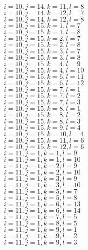 \documentclass[14pt]{article}
\begin{document}
    $i=10,j=14,k=11,l=8 $ \\ 
    $i=10,j=14,k=12,l=7 $ \\ 
    $i=10,j=14,k=12,l=8 $ \\ 
    $i=10,j=15,k=1,l=7 $ \\ 
    $i=10,j=15,k=1,l=8 $ \\ 
    $i=10,j=15,k=2,l=7 $ \\ 
    $i=10,j=15,k=2,l=8 $ \\ 
    $i=10,j=15,k=3,l=7 $ \\ 
    $i=10,j=15,k=3,l=8 $ \\ 
    $i=10,j=15,k=4,l=9 $ \\ 
    $i=10,j=15,k=4,l=10 $ \\ 
    $i=10,j=15,k=6,l=11 $ \\ 
    $i=10,j=15,k=6,l=12 $ \\ 
    $i=10,j=15,k=7,l=1 $ \\ 
    $i=10,j=15,k=7,l=2 $ \\ 
    $i=10,j=15,k=7,l=3 $ \\ 
    $i=10,j=15,k=8,l=1 $ \\ 
    $i=10,j=15,k=8,l=2 $ \\ 
    $i=10,j=15,k=8,l=3 $ \\ 
    $i=10,j=15,k=9,l=4 $ \\ 
    $i=10,j=15,k=10,l=4 $ \\ 
    $i=10,j=15,k=11,l=6 $ \\ 
    $i=10,j=15,k=12,l=6 $ \\ 
    $i=11,j=1,k=1,l=9 $ \\ 
    $i=11,j=1,k=1,l=10 $ \\ 
    $i=11,j=1,k=2,l=9 $ \\ 
    $i=11,j=1,k=2,l=10 $ \\ 
    $i=11,j=1,k=3,l=9 $ \\ 
    $i=11,j=1,k=3,l=10 $ \\ 
    $i=11,j=1,k=5,l=7 $ \\ 
    $i=11,j=1,k=5,l=8 $ \\ 
    $i=11,j=1,k=6,l=13 $ \\ 
    $i=11,j=1,k=6,l=14 $ \\ 
    $i=11,j=1,k=7,l=5 $ \\ 
    $i=11,j=1,k=8,l=5 $ \\ 
    $i=11,j=1,k=9,l=1 $ \\ 
    $i=11,j=1,k=9,l=2 $ \\ 
    $i=11,j=1,k=9,l=3 $ \\ 
\end{document}
